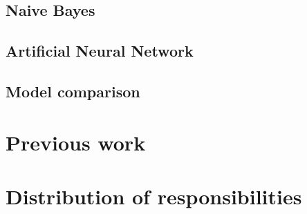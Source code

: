 \subsection{Naive Bayes}

\subsection{Artificial Neural Network}

\subsection{Model comparison}

\section{Previous work}

\appendix
\section{Distribution of responsibilities}